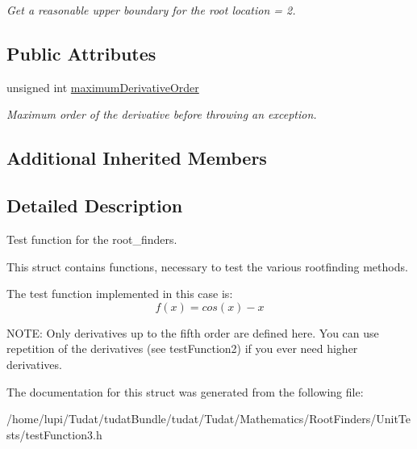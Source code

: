 \begin{DoxyCompactItemize}
\begin{DoxyCompactList}\small\item\em Get a reasonable upper boundary for the root location = 2. \end{DoxyCompactList}\end{DoxyCompactItemize}
\subsection*{Public Attributes}
\begin{DoxyCompactItemize}
\item 
unsigned int \hyperlink{structtudat_1_1unit__tests_1_1TestFunction3_ab0cc5cf7fa9af2c0825f525757fa9bda}{maximum\+Derivative\+Order}\hypertarget{structtudat_1_1unit__tests_1_1TestFunction3_ab0cc5cf7fa9af2c0825f525757fa9bda}{}\label{structtudat_1_1unit__tests_1_1TestFunction3_ab0cc5cf7fa9af2c0825f525757fa9bda}

\begin{DoxyCompactList}\small\item\em Maximum order of the derivative before throwing an exception. \end{DoxyCompactList}\end{DoxyCompactItemize}
\subsection*{Additional Inherited Members}


\subsection{Detailed Description}
Test function for the root\+\_\+finders. 

This struct contains functions, necessary to test the various rootfinding methods.

The test function implemented in this case is\+: \[ f(x) = cos(x) - x \]

N\+O\+TE\+: Only derivatives up to the fifth order are defined here. You can use repetition of the derivatives (see test\+Function2) if you ever need higher derivatives. 

The documentation for this struct was generated from the following file\+:\begin{DoxyCompactItemize}
\item 
/home/lupi/\+Tudat/tudat\+Bundle/tudat/\+Tudat/\+Mathematics/\+Root\+Finders/\+Unit\+Tests/test\+Function3.\+h\end{DoxyCompactItemize}
